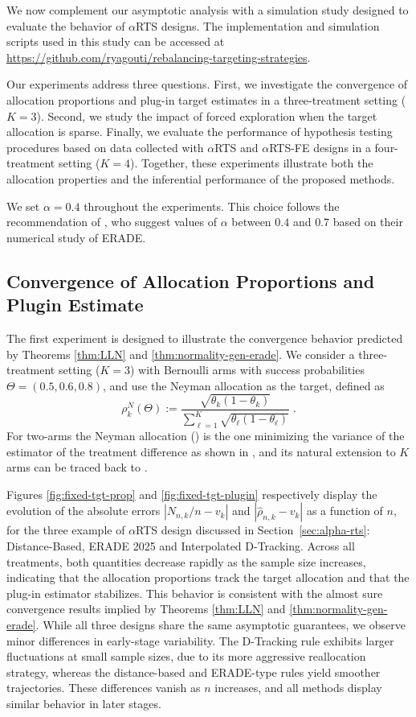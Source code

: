 We now complement our asymptotic analysis with a simulation study designed to evaluate the behavior of $\alpha$RTS designs. The implementation and simulation scripts used in this study can be accessed at \url{https://github.com/ryagouti/rebalancing-targeting-strategies}.

	Our experiments address three questions. First, we investigate the
	convergence of allocation proportions and plug-in target estimates in a
	three-treatment setting (\(K=3\)). Second, we study the impact of forced
	exploration when the target allocation is sparse. Finally, we evaluate the
	performance of hypothesis testing procedures based on data collected with
	\(\alpha\)RTS and \(\alpha\)RTS-FE designs in a four-treatment setting
	(\(K=4\)). Together, these experiments illustrate both the allocation
	properties and the inferential performance of the proposed methods.
	
	We set \(\alpha=0.4\) throughout the experiments. This choice follows the recommendation of \cite{hu2009efficient}, who suggest values of \(\alpha\) between \(0.4\) and \(0.7\)
	based on their numerical study of ERADE.

\subsection{Convergence of Allocation Proportions and Plugin Estimate}

The first experiment is designed to illustrate the convergence behavior predicted by Theorems \ref{thm:LLN} and \ref{thm:normality-gen-erade}. We consider a three-treatment setting (\(K=3\)) with Bernoulli arms with success probabilities $\Theta=(0.5, 0.6, 0.8)$, and use the Neyman allocation as the target, defined as
\[\rho_k^N(\Theta) := \frac{\sqrt{\theta_k(1-\theta_k)}}{\sum_{\ell=1}^{K}\sqrt{\theta_{\ell}(1-\theta_{\ell})}}\;.\]
For two-arms the Neyman allocation (\cite{neyman1934representative}) is the one minimizing the variance of the estimator of the treatment difference as shown in \cite{melfi1998variablility}, and its natural extension to $K$ arms can be traced back to \cite{Cochran1977}.

Figures \ref{fig:fixed-tgt-prop} and \ref{fig:fixed-tgt-plugin} respectively  display  the evolution of the absolute errors $|N_{n,k}/n - v_k|$ and $|\hat{\rho}_{n,k} - v_k|$ as a function of $n$, for the three example of $\alpha$RTS design discussed in Section~\ref{sec:alpha-rts}: Distance-Based, ERADE 2025 and Interpolated D-Tracking. Across all treatments, both quantities decrease rapidly as the sample size increases, indicating that the allocation proportions track the target allocation and that the plug-in estimator stabilizes. This behavior is consistent with the almost sure convergence results  implied by Theorems \ref{thm:LLN} and \ref{thm:normality-gen-erade}. While all three designs share the same asymptotic guarantees, we observe minor differences in early-stage variability. The D-Tracking rule exhibits larger fluctuations at small sample sizes, due to its more aggressive reallocation strategy, whereas the distance-based and ERADE-type rules yield smoother trajectories. These differences vanish as $n$ increases, and all methods display similar behavior in later stages.

